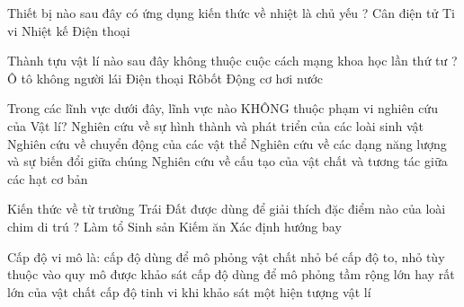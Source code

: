 \begin{ex}
Thiết bị nào sau đây có ứng dụng kiến thức về nhiệt là chủ yếu ?
\choice
{Cân điện tử}
{Ti vi}
{\True Nhiệt kế}
{Điện thoại}
\end{ex}

\begin{ex}
Thành tựu vật lí nào sau đây không thuộc cuộc cách mạng khoa học lần thứ tư ?
\choice
{Ô tô không người lái}
{Điện thoại}
{Rôbốt}
{\True Động cơ hơi nước}
\end{ex}

\begin{ex}
Trong các lĩnh vực dưới đây, lĩnh vực nào KHÔNG thuộc phạm vi nghiên cứu của Vật lí?
\choice
{Nghiên cứu về sự hình thành và phát triển của các loài sinh vật}
{\True Nghiên cứu về chuyển động của các vật thể}
{Nghiên cứu về các dạng năng lượng và sự biến đổi giữa chúng}
{Nghiên cứu về cấu tạo của vật chất và tương tác giữa các hạt cơ bản}
\end{ex}

\begin{ex}
Kiến thức về từ trường Trái Đất được dùng để giải thích đặc điểm nào của loài chim di trú ?
\choice
{Làm tổ}
{Sinh sản}
{Kiếm ăn}
{\True Xác định hướng bay}
\end{ex}

\begin{ex}
Cấp độ vi mô là:
\choice
{\True cấp độ dùng để mô phỏng vật chất nhỏ bé}
{cấp độ to, nhỏ tùy thuộc vào quy mô được khảo sát}
{cấp độ dùng để mô phỏng tầm rộng lớn hay rất lớn của vật chất}
{cấp độ tinh vi khi khảo sát một hiện tượng vật lí}
\end{ex}

